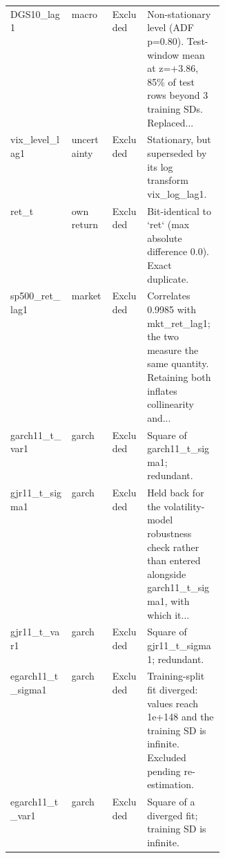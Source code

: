 \begin{table}[htbp]
\begin{tabular}{l l l p{0.36\linewidth}}
DGS10\_lag1 & macro & Excluded & Non-stationary level (ADF p=0.80). Test-window mean at z=+3.86, 85\% of test rows beyond 3 training SDs. Replaced... \\
vix\_level\_lag1 & uncertainty & Excluded & Stationary, but superseded by its log transform vix\_log\_lag1. \\
ret\_t & own return & Excluded & Bit-identical to `ret` (max absolute difference 0.0). Exact duplicate. \\
sp500\_ret\_lag1 & market & Excluded & Correlates 0.9985 with mkt\_ret\_lag1; the two measure the same quantity. Retaining both inflates collinearity and... \\
garch11\_t\_var1 & garch & Excluded & Square of garch11\_t\_sigma1; redundant. \\
gjr11\_t\_sigma1 & garch & Excluded & Held back for the volatility-model robustness check rather than entered alongside garch11\_t\_sigma1, with which it... \\
gjr11\_t\_var1 & garch & Excluded & Square of gjr11\_t\_sigma1; redundant. \\
egarch11\_t\_sigma1 & garch & Excluded & Training-split fit diverged: values reach 1e+148 and the training SD is infinite. Excluded pending re-estimation. \\
egarch11\_t\_var1 & garch & Excluded & Square of a diverged fit; training SD is infinite. \\
\bottomrule
\end{tabular}
\end{table}